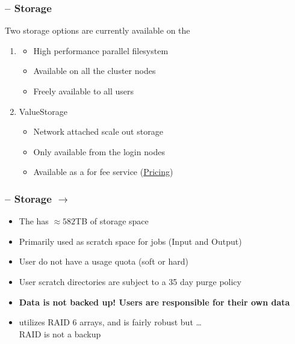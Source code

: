 \begin{frame}
	\frametitle{{\craycs} -- Storage}
	Two storage options are currently available on the {\craycs}
	\begin{enumerate}
		\item {\lustre}
                  \begin{itemize}
                  \item High performance parallel filesystem 
                  \item Available on all the cluster nodes
                    \item Freely available to all users
                  \end{itemize}
		\item ValueStorage
                  \begin{itemize}
                  \item Network attached scale out storage
                  \item Only available from the login nodes
                  \item Available as a for fee service (\href{http://www.hawaii.edu/its/value-storage-pricing/}{Pricing})
                  \end{itemize}
	\end{enumerate}
\end{frame}


\begin{frame}
	\frametitle{{\craycs} -- Storage $\rightarrow$ {\lustre}}
	\begin{itemize}
		\item The {\craycs} has $\approx582$TB of storage space

		\item Primarily used as scratch space for jobs (Input and Output)
		\item User do not have a usage quota (soft or hard)
		\item User scratch directories are subject to a 35 day purge policy
		\item \textbf{Data is not backed up!  Users are responsible for their own data}
                \item {\lustre} utilizes RAID 6 arrays, and is fairly robust but \ldots~\\RAID is not a backup
	\end{itemize}
\end{frame}



